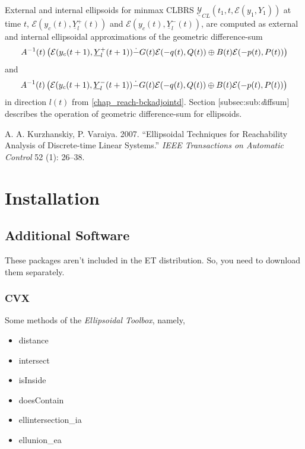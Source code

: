 \documentclass[letterpaper,10pt,english]{sphinxmanual}
\begin{document}
External and internal ellipsoids for minmax CLBRS
$\underline{{\mathcal Y}}_{CL}(t_1,t,{\mathcal E}(y_1,Y_1))$ at
time $t$, ${\mathcal E}(y_c(t),\underline{Y}^+_l(t))$ and
${\mathcal E}(y_c(t),\underline{Y}^-_l(t))$, are computed as
external and internal ellipsoidal approximations of the geometric
difference-sum
\begin{gather}
\begin{split}A^{-1}(t)\left(
{\mathcal E}(y_c(t+1),\underline{Y}^+_l(t+1))
\dot{-}G(t){\mathcal E}(-q(t),Q(t))
\oplus B(t){\mathcal E}(-p(t),P(t))
\right)\end{split}\notag
\end{gather}
and
\begin{gather}
\begin{split}A^{-1}(t)\left(
{\mathcal E}(y_c(t+1),\underline{Y}^-_l(t+1))
\dot{-}G(t){\mathcal E}(-q(t),Q(t))
\oplus B(t){\mathcal E}(-p(t),P(t))
\right)\end{split}\notag
\end{gather}
in direction $l(t)$ from \eqref{chap_reach-bckadjointd}. Section
{[}subsec:sub:\emph{d}iffsum{]} describes the operation of geometric
difference-sum for ellipsoids.

A. A. Kurzhanskiy, P. Varaiya. 2007. “Ellipsoidal Techniques for
Reachability Analysis of Discrete-time Linear Systems.” \emph{IEEE
Transactions on Automatic Control} 52 (1): 26–38.


\chapter{Installation}
\label{chap_install:installation}\label{chap_install::doc}

\section{Additional Software}
\label{chap_install:additional-software}
These packages aren’t included in the ET distribution. So, you need to
download them separately.


\subsection{CVX}
\label{chap_install:cvx}
Some methods of the \emph{Ellipsoidal Toolbox}, namely,
\begin{itemize}
\item {} 
distance

\item {} 
intersect

\item {} 
isInside

\item {} 
doesContain

\item {} 
ellintersection\_ia

\item {} 
ellunion\_ea

\end{itemize}
\end{document}
